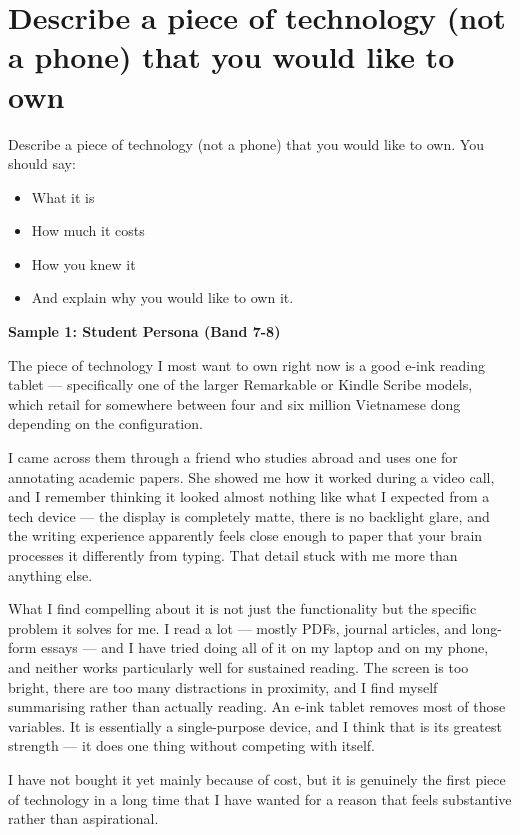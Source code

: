 \section{Describe a piece of technology (not a phone) that you would like to own}
\begin{ieltsprompt}
Describe a piece of technology (not a phone) that you would like to own.
You should say:
\begin{itemize}[leftmargin=2em, itemsep=2pt]
\item What it is
\item How much it costs
\item How you knew it
\item And explain why you would like to own it.
\end{itemize}
\end{ieltsprompt}
\begin{ieltsanswer}
\textbf{Sample 1: Student Persona (Band 7-8)}

The piece of technology I most want to own right now is a good e-ink reading tablet — specifically one of the larger Remarkable or Kindle Scribe models, which retail for somewhere between four and six million Vietnamese dong depending on the configuration.

I came across them through a friend who studies abroad and uses one for annotating academic papers. She showed me how it worked during a video call, and I remember thinking it looked almost nothing like what I expected from a tech device — the display is completely matte, there is no backlight glare, and the writing experience apparently feels close enough to paper that your brain processes it differently from typing. That detail stuck with me more than anything else.

What I find compelling about it is not just the functionality but the specific problem it solves for me. I read a lot — mostly PDFs, journal articles, and long-form essays — and I have tried doing all of it on my laptop and on my phone, and neither works particularly well for sustained reading. The screen is too bright, there are too many distractions in proximity, and I find myself summarising rather than actually reading. An e-ink tablet removes most of those variables. It is essentially a single-purpose device, and I think that is its greatest strength — it does one thing without competing with itself.

I have not bought it yet mainly because of cost, but it is genuinely the first piece of technology in a long time that I have wanted for a reason that feels substantive rather than aspirational.


\end{ieltsanswer}

